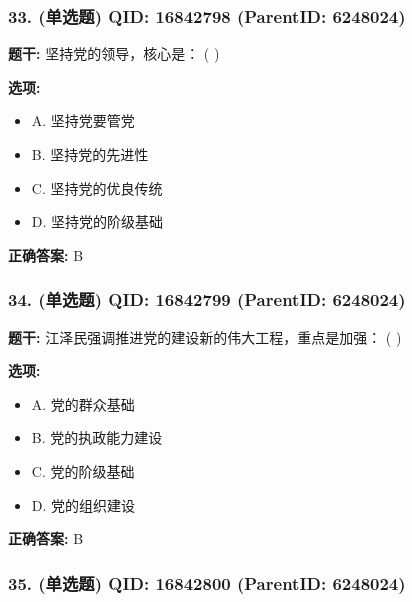 \documentclass[12pt,UTF8]{ctexart}
\begin{document}
\subsubsection*{33. (单选题) \small QID: 16842798 (ParentID: 6248024)}

\textbf{题干:}
坚持党的领导，核心是： ( )



\textbf{选项:}
\begin{itemize}[leftmargin=*]

  \item A. 坚持党要管党

  \item B. 坚持党的先进性

  \item C. 坚持党的优良传统

  \item D. 坚持党的阶级基础

\end{itemize}

\textbf{正确答案:}
B

\vspace{0.3em}\hrulefill\vspace{0.7em}

\subsubsection*{34. (单选题) \small QID: 16842799 (ParentID: 6248024)}

\textbf{题干:}
江泽民强调推进党的建设新的伟大工程，重点是加强： ( )



\textbf{选项:}
\begin{itemize}[leftmargin=*]

  \item A. 党的群众基础

  \item B. 党的执政能力建设

  \item C. 党的阶级基础

  \item D. 党的组织建设

\end{itemize}

\textbf{正确答案:}
B

\vspace{0.3em}\hrulefill\vspace{0.7em}

\subsubsection*{35. (单选题) \small QID: 16842800 (ParentID: 6248024)}
\end{document}
